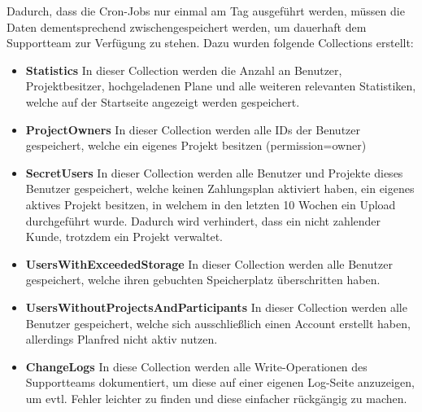 Dadurch, dass die Cron-Jobs nur einmal am Tag ausgeführt werden, müssen die Daten dementsprechend zwischengespeichert werden, um dauerhaft dem Supportteam zur Verfügung zu stehen. Dazu wurden folgende Collections erstellt:
\begin{itemize}
    \item \textbf{Statistics}
        \newline
        In dieser Collection werden die Anzahl an Benutzer, Projektbesitzer, hochgeladenen Plane und alle weiteren relevanten Statistiken, welche auf der Startseite angezeigt werden gespeichert.
    \item \textbf{ProjectOwners}
        \newline
        In dieser Collection werden alle IDs der Benutzer gespeichert, welche ein eigenes Projekt besitzen (permission=owner)
    \item \textbf{SecretUsers}
        \newline
        In dieser Collection werden alle Benutzer und Projekte dieses Benutzer gespeichert, welche keinen Zahlungsplan aktiviert haben, ein eigenes aktives Projekt besitzen, in welchem in den letzten 10 Wochen ein Upload durchgeführt wurde. Dadurch wird verhindert, dass ein nicht zahlender Kunde, trotzdem ein Projekt verwaltet.
    \item \textbf{UsersWithExceededStorage}
        \newline
        In dieser Collection werden alle Benutzer gespeichert, welche ihren gebuchten Speicherplatz überschritten haben.
    \item \textbf{UsersWithoutProjectsAndParticipants}
        \newline
        In dieser Collection werden alle Benutzer gespeichert, welche sich ausschließlich einen Account erstellt haben, allerdings Planfred nicht aktiv nutzen.
    \item \textbf{ChangeLogs}
        \newline
        In diese Collection werden alle Write-Operationen des Supportteams dokumentiert, um diese auf einer eigenen Log-Seite anzuzeigen, um evtl. Fehler leichter zu finden und diese einfacher rückgängig zu machen.
\end{itemize}